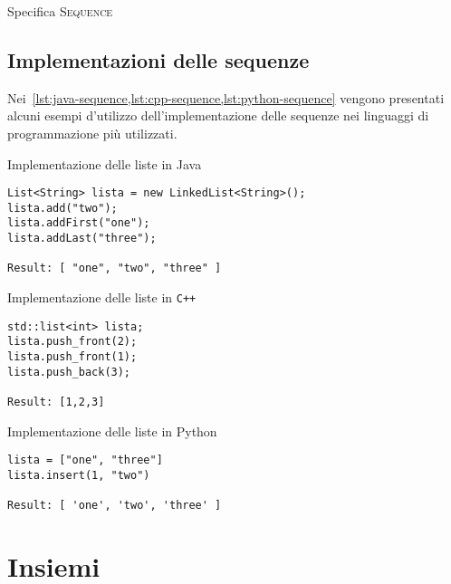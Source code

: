 \begin{algorithm}[H]
	\caption[Specifica sequenza]{Specifica \textsc{Sequence}}
	
\end{algorithm}

\clearpage
\subsection{Implementazioni delle sequenze}

Nei~\cref{lst:java-sequence,lst:cpp-sequence,lst:python-sequence} vengono presentati alcuni esempi d'utilizzo dell'implementazione delle sequenze nei linguaggi di programmazione più utilizzati.

\begin{listing}[H]
\caption{Implementazione delle liste in Java}%
\label{lst:java-sequence}%
\begin{verbatim}
List<String> lista = new LinkedList<String>();
lista.add("two");
lista.addFirst("one");
lista.addLast("three");

Result: [ "one", "two", "three" ]
\end{verbatim}
\end{listing}
\vspace{-10pt}

\begin{listing}[H]
\caption{Implementazione delle liste in \texttt{C++}}%
\label{lst:cpp-sequence}
\begin{verbatim}
std::list<int> lista;
lista.push_front(2);
lista.push_front(1);
lista.push_back(3);

Result: [1,2,3]
\end{verbatim}
\end{listing}
\vspace{-10pt}

\begin{listing}[H]
\caption{Implementazione delle liste in Python}%
\label{lst:python-sequence}
\begin{verbatim}
lista = ["one", "three"]
lista.insert(1, "two")

Result: [ 'one', 'two', 'three' ]
\end{verbatim}
\end{listing}
\vspace{-10pt}

\section{Insiemi}

